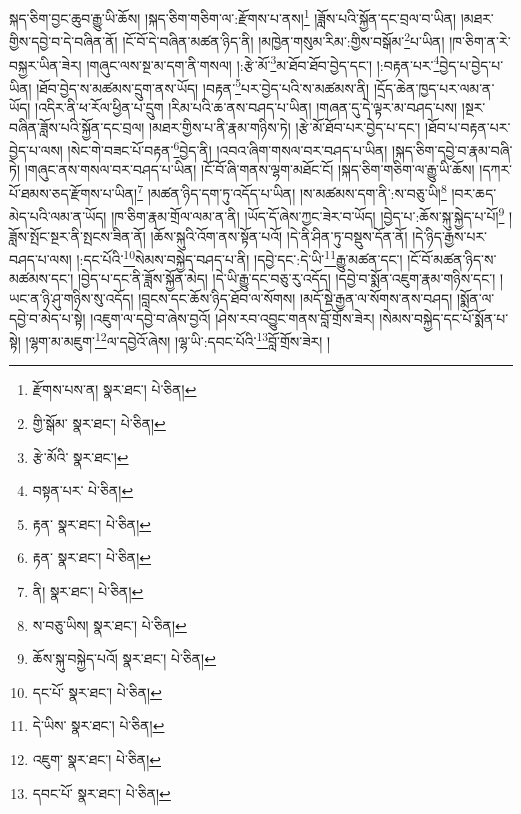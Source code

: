 སྐད་ཅིག་བྱང་ཆུབ་རྒྱུ་ཡི་ཆོས། །སྐད་ཅིག་གཅིག་ལ་:རྫོགས་པ་ནས།\footnote{རྫོགས་པས་ན།  སྣར་ཐང་།  པེ་ཅིན། } །ཟློས་པའི་སྐྱོན་དང་བྲལ་བ་ཡིན། །མཐར་གྱིས་དབྱེ་བ་དེ་བཞིན་ནོ། །ངོ་བོ་དེ་བཞིན་མཚན་ཉིད་ནི། །མཁྱེན་གསུམ་རིམ་:གྱིས་བསྒོམ་\footnote{གྱི་སྒོམ་  སྣར་ཐང་།  པེ་ཅིན། }པ་ཡིན། །ཁ་ཅིག་ན་རེ་བསྐྱར་ཡིན་ཟེར། །གཞུང་ལས་སྔ་མ་དག་ནི་གསལ། །:རྩེ་མོ་\footnote{རྩེ་མོའི་  སྣར་ཐང་། }མ་ཐོབ་ཐོབ་བྱེད་དང་། །:བརྟན་པར་\footnote{བསྟན་པར་  པེ་ཅིན། }བྱེད་པ་བྱེད་པ་ཡིན། །ཐོབ་བྱེད་ས་མཚམས་དྲུག་ནས་ཡོད། །བརྟན་\footnote{རྟན་  སྣར་ཐང་།  པེ་ཅིན། }པར་བྱེད་པའི་ས་མཚམས་ནི། །དྲོད་ཆེན་ཁྱད་པར་ལམ་ན་ཡོད། །འདིར་ནི་ཕ་རོལ་ཕྱིན་པ་དྲུག །རིམ་པའི་ཆ་ནས་བཤད་པ་ཡིན། །གཞན་དུ་དེ་ལྟར་མ་བཤད་པས། །སྔར་བཞིན་ཟློས་པའི་སྐྱོན་དང་བྲལ། །མཐར་གྱིས་པ་ནི་རྣམ་གཉིས་ཏེ། །རྩེ་མོ་ཐོབ་པར་བྱེད་པ་དང་། །ཐོབ་པ་བརྟན་པར་བྱེད་པ་ལས། །སེང་གེ་བཟང་པོ་བརྟན་\footnote{རྟན་  སྣར་ཐང་།  པེ་ཅིན། }བྱེད་ནི། །འབའ་ཞིག་གསལ་བར་བཤད་པ་ཡིན། །སྐད་ཅིག་དབྱེ་བ་རྣམ་བཞི་ཏེ། །གཞུང་ནས་གསལ་བར་བཤད་པ་ཡིན། །ངོ་བོ་ཞི་གནས་ལྷག་མཐོང་ངོ། །སྐད་ཅིག་གཅིག་ལ་རྒྱུ་ཡི་ཆོས། །དཀར་པོ་ཐམས་ཅད་རྫོགས་པ་ཡིན།\footnote{ནི།  སྣར་ཐང་།  པེ་ཅིན། } །མཚན་ཉིད་དག་ཏུ་འདོད་པ་ཡིན། །ས་མཚམས་དག་ནི་:ས་བཅུ་ཡི།\footnote{ས་བཅུ་ཡིས།  སྣར་ཐང་།  པེ་ཅིན། } །བར་ཆད་མེད་པའི་ལམ་ན་ཡོད། །ཁ་ཅིག་རྣམ་གྲོལ་ལམ་ན་ནི། །ཡོད་དོ་ཞེས་ཀྱང་ཟེར་བ་ཡོད། །བྱེད་པ་:ཆོས་སྐུ་སྐྱེད་པ་པོ།\footnote{ཆོས་སྐུ་བསྐྱེད་པའོ།  སྣར་ཐང་།  པེ་ཅིན། } །ཟློས་སྤོང་སྔར་ནི་སྤངས་ཟིན་ནོ། །ཆོས་སྐུའི་འོག་ནས་སྟོན་པའོ། །དེ་ནི་ཤིན་ཏུ་བསྡུས་དོན་ནོ། །དེ་ཉིད་རྒྱས་པར་བཤད་པ་ལས། །:དང་པོའི་\footnote{དང་པོ་  སྣར་ཐང་།  པེ་ཅིན། }སེམས་བསྐྱེད་བཤད་པ་ནི། །དབྱེ་དང་:དེ་ཡི་\footnote{དེ་ཡིས་  སྣར་ཐང་།  པེ་ཅིན། }རྒྱུ་མཚན་དང་། །ངོ་བོ་མཚན་ཉིད་ས་མཚམས་དང་། །བྱེད་པ་དང་ནི་ཟློས་སྐྱོན་མེད། །དེ་ཡི་རྒྱུ་དང་བཅུ་རུ་འདོད། །དབྱེ་བ་སྨོན་འཇུག་རྣམ་གཉིས་དང་། །ཡང་ན་ཉི་ཤུ་གཉིས་སུ་འདོད། །བླངས་དང་ཆོས་ཉིད་ཐོབ་ལ་སོགས། །མདོ་སྡེ་རྒྱན་ལ་སོགས་ནས་བཤད། །སྨོན་ལ་དབྱེ་བ་མེད་པ་སྟེ། །འཇུག་ལ་དབྱེ་བ་ཞེས་བྱའོ། །ཤེས་རབ་འབྱུང་གནས་བློ་གྲོས་ཟེར། །སེམས་བསྐྱེད་དང་པོ་སྨོན་པ་སྟེ། །ལྷག་མ་མཇུག་\footnote{འཇུག་  སྣར་ཐང་།  པེ་ཅིན། }ལ་དབྱེའོ་ཞེས། །ལྷ་ཡི་:དབང་པོའི་\footnote{དབང་པོ་  སྣར་ཐང་།  པེ་ཅིན། }བློ་གྲོས་ཟེར། །

